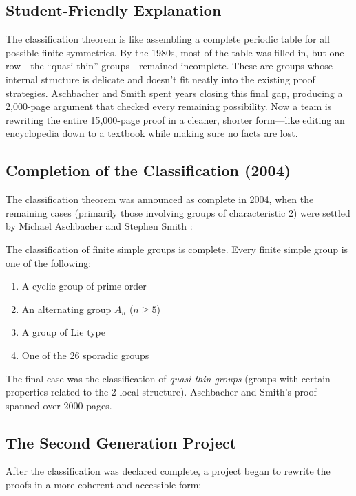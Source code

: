 \subsection{Student-Friendly Explanation}
The classification theorem is like assembling a complete periodic table for all possible finite symmetries. By the 1980s, most of the table was filled in, but one row---the ``quasi-thin'' groups---remained incomplete. These are groups whose internal structure is delicate and doesn't fit neatly into the existing proof strategies. Aschbacher and Smith spent years closing this final gap, producing a 2,000-page argument that checked every remaining possibility. Now a team is rewriting the entire 15,000-page proof in a cleaner, shorter form---like editing an encyclopedia down to a textbook while making sure no facts are lost.

\subsection{Completion of the Classification (2004)}

The classification theorem was announced as complete in 2004, when the remaining cases (primarily those involving groups of characteristic 2) were settled by Michael Aschbacher and Stephen Smith \cite{aschbacher2004}:

\begin{theorem}
The classification of finite simple groups is complete. Every finite simple group is one of the following:
\begin{enumerate}
\item A cyclic group of prime order
\item An alternating group $A_n$ ($n \geq 5$)
\item A group of Lie type
\item One of the 26 sporadic groups
\end{enumerate}
\end{theorem}

The final case was the classification of \emph{quasi-thin groups} (groups with certain properties related to the 2-local structure). Aschbacher and Smith's proof spanned over 2000 pages.

\subsection{The Second Generation Project}

After the classification was declared complete, a project began to rewrite the proofs in a more coherent and accessible form:

